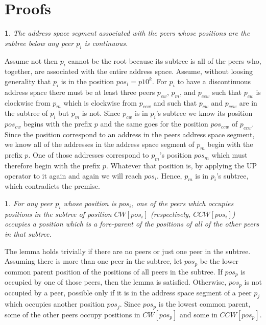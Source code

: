 \documentclass[12pt,english,journal]{elsarticle}
\makeatletter
\numberwithin{equation}{section}
\numberwithin{figure}{section}
\theoremstyle{plain}
\theoremstyle{plain}
\newtheorem{lem}[thm]{\protect\lemmaname}
\newenvironment{proof}[1][\protect\proofname]{\par
\normalfont\topsep6\p@\@plus6\p@\relax
\trivlist
\itemindent\parindent
\item[\hskip\labelsep
\scshape
#1]\ignorespaces
}{\endtrivlist\@endpefalse
}
\providecommand{\proofname}{Proof}
\providecommand{\lemmaname}{Lemma}
\makeatother
\begin{document}
\section{\label{sec:Proofs}Proofs}
\begin{lem}
The address space segment associated with the peers whose positions
are the subtree below any peer $p_{i}$ is continuous.\end{lem}
\begin{proof}
Assume not then $p_{i}$ cannot be the root because its subtree is
all of the peers who, together, are associated with the entire address
space. Assume, without loosing generality that $p_{i}$ is in the
position $pos_{i}=p10^{k}$. For $p_{i}$ to have a discontinuous
address space there must be at least three peers $p_{cw}$, $p_{m}$,
and $p_{ccw}$ such that $p_{cw}$ is clockwise from $p_{m}$ which
is clockwise from $p_{ccw}$ and such that $p_{cw}$ and $p_{ccw}$
are in the subtree of $p_{i}$ but $p_{m}$ is not. Since $p_{cw}$
is in $p_{i}$'s subtree we know its position $pos_{cw}$ begins with
the prefix $p$ and the same goes for the position $pos_{ccw}$ of
$p_{ccw}$. Since the position correspond to an address in the peers
address space segment, we know all of the addresses in the address
space segment of $p_{m}$ begin with the prefix $p$. One of those
addresses correspond to $p_{m}$'s position $pos_{m}$ which must
therefore begin with the prefix $p$. Whatever that position is, by
applying the UP operator to it again and again we will reach $pos_{i}$.
Hence, $p_{m}$ is in $p_{i}$'s subtree, which contradicts the premise.\end{proof}
\begin{lem}
For any peer $p_{i}$ whose position is $pos_{i}$, one of the peers
which occupies positions in the subtree of position $CW\left[pos_{i}\right]$
(respectively, $CCW\left[pos_{i}\right]$) occupies a position which
is a fore-parent of the positions of all of the other peers in that
subtree.
\end{lem}
The lemma holds trivially if there are no peers or just one peer in
the subtree. Assuming there is more than one peer in the subtree,
let $pos_{p}$ be the lower common parent position of the positions
of all peers in the subtree. If $pos_{p}$ is occupied by one of those
peers, then the lemma is satisfied. Otherwise, $pos_{p}$ is not occupied
by a peer, possible only if it is in the address space segment of
a peer $p_{j}$ which occupies another position $pos_{j}$. Since
$pos_{p}$ is the lowest common parent, some of the other peers occupy
positions in $CW\left[pos_{p}\right]$ and some in $CCW\left[pos_{p}\right]$.
\end{document}
